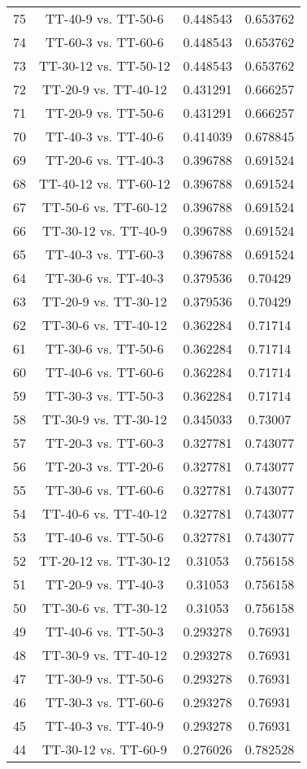 \documentclass[a4paper,10pt]{article}
\begin{document}
\begin{landscape}
\begin{table}[!htp]
\begin{tabular}{cccc}
75&TT-40-9 vs. TT-50-6&0.448543&0.653762\\
74&TT-60-3 vs. TT-60-6&0.448543&0.653762\\
73&TT-30-12 vs. TT-50-12&0.448543&0.653762\\
72&TT-20-9 vs. TT-40-12&0.431291&0.666257\\
71&TT-20-9 vs. TT-50-6&0.431291&0.666257\\
70&TT-40-3 vs. TT-40-6&0.414039&0.678845\\
69&TT-20-6 vs. TT-40-3&0.396788&0.691524\\
68&TT-40-12 vs. TT-60-12&0.396788&0.691524\\
67&TT-50-6 vs. TT-60-12&0.396788&0.691524\\
66&TT-30-12 vs. TT-40-9&0.396788&0.691524\\
65&TT-40-3 vs. TT-60-3&0.396788&0.691524\\
64&TT-30-6 vs. TT-40-3&0.379536&0.70429\\
63&TT-20-9 vs. TT-30-12&0.379536&0.70429\\
62&TT-30-6 vs. TT-40-12&0.362284&0.71714\\
61&TT-30-6 vs. TT-50-6&0.362284&0.71714\\
60&TT-40-6 vs. TT-60-6&0.362284&0.71714\\
59&TT-30-3 vs. TT-50-3&0.362284&0.71714\\
58&TT-30-9 vs. TT-30-12&0.345033&0.73007\\
57&TT-20-3 vs. TT-60-3&0.327781&0.743077\\
56&TT-20-3 vs. TT-20-6&0.327781&0.743077\\
55&TT-30-6 vs. TT-60-6&0.327781&0.743077\\
54&TT-40-6 vs. TT-40-12&0.327781&0.743077\\
53&TT-40-6 vs. TT-50-6&0.327781&0.743077\\
52&TT-20-12 vs. TT-30-12&0.31053&0.756158\\
51&TT-20-9 vs. TT-40-3&0.31053&0.756158\\
50&TT-30-6 vs. TT-30-12&0.31053&0.756158\\
49&TT-40-6 vs. TT-50-3&0.293278&0.76931\\
48&TT-30-9 vs. TT-40-12&0.293278&0.76931\\
47&TT-30-9 vs. TT-50-6&0.293278&0.76931\\
46&TT-30-3 vs. TT-60-6&0.293278&0.76931\\
45&TT-40-3 vs. TT-40-9&0.293278&0.76931\\
44&TT-30-12 vs. TT-60-9&0.276026&0.782528\\

\end{tabular}
\end{table}
\end{landscape}
\end{document}
